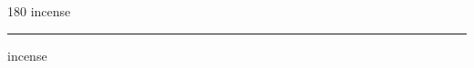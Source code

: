 
\begin{frame}
\begin{center}
\begin{turn}{180}
{\fontsize{2.5cm}{1em}\selectfont incense}
\end{turn}
\vspace{1em}\par  
\hrule
\vspace{1em}\par  
{\fontsize{2.5cm}{1em}\selectfont incense}
\end{center}
\end{frame}
